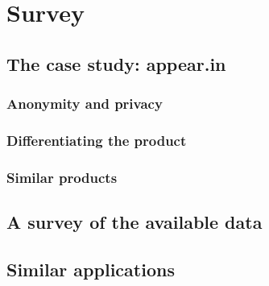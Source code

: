 \chapter{Survey}

\label{Chapter2}


\section{The case study: appear.in} %
\label{sec:the_case_study}

\subsection{Anonymity and privacy}

\subsection{Differentiating the product}

\subsection{Similar products}


\section{A survey of the available data} %
\label{sec:survey_data}


\section{Similar applications} %
\label{sec:similar_applications}



